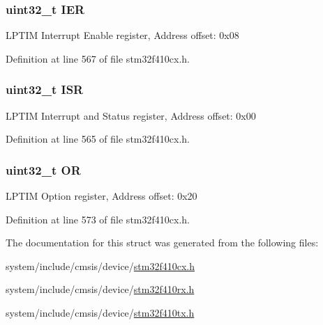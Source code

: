 \subsubsection[{\texorpdfstring{I\+ER}{IER}}]{ uint32\+\_\+t I\+ER}\hypertarget{struct_l_p_t_i_m___type_def_a6566f8cfbd1d8aa7e8db046aa35e77db}{}\label{struct_l_p_t_i_m___type_def_a6566f8cfbd1d8aa7e8db046aa35e77db}
L\+P\+T\+IM Interrupt Enable register, Address offset\+: 0x08 

Definition at line 567 of file stm32f410cx.\+h.

\subsubsection[{\texorpdfstring{I\+SR}{ISR}}]{ uint32\+\_\+t I\+SR}\hypertarget{struct_l_p_t_i_m___type_def_ab3c49a96815fcbee63d95e1e74f20e75}{}\label{struct_l_p_t_i_m___type_def_ab3c49a96815fcbee63d95e1e74f20e75}
L\+P\+T\+IM Interrupt and Status register, Address offset\+: 0x00 

Definition at line 565 of file stm32f410cx.\+h.

\subsubsection[{\texorpdfstring{OR}{OR}}]{ uint32\+\_\+t OR}\hypertarget{struct_l_p_t_i_m___type_def_a75ade4a9b3d40781fd80ce3e6589e98b}{}\label{struct_l_p_t_i_m___type_def_a75ade4a9b3d40781fd80ce3e6589e98b}
L\+P\+T\+IM Option register, Address offset\+: 0x20 

Definition at line 573 of file stm32f410cx.\+h.



The documentation for this struct was generated from the following files\+:\begin{DoxyCompactItemize}
\item 
system/include/cmsis/device/\hyperlink{stm32f410cx_8h}{stm32f410cx.\+h}\item 
system/include/cmsis/device/\hyperlink{stm32f410rx_8h}{stm32f410rx.\+h}\item 
system/include/cmsis/device/\hyperlink{stm32f410tx_8h}{stm32f410tx.\+h}\end{DoxyCompactItemize}

